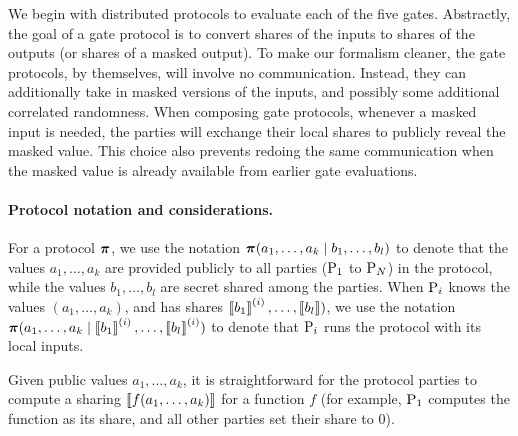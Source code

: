 
We begin with distributed protocols to evaluate each of the five gates. Abstractly, the goal of a gate protocol is to convert  shares of the inputs to shares of the outputs (or shares of a masked output). To make our formalism cleaner, the gate protocols, by themselves, will involve no communication. Instead, they can additionally take in masked versions of the inputs, and possibly some additional correlated randomness. When composing gate protocols, whenever a masked input is needed, the parties will exchange their local shares to publicly reveal the masked value. This choice also prevents redoing the same communication when the masked value is already available from earlier gate evaluations.


\iffull
\paragraph{Protocol notation and considerations.}
For a protocol $\boldsymbol{\pi}$, we use the notation $\boldsymbol{\pi}(a_1, \dots, a_k \mid b_1, \dots, b_l)$ to denote that the values $a_1, \dots, a_k$ are provided publicly to all parties ($\textnormal{P}_1$ to $\textnormal{P}_N$) in the protocol, while the values $b_1, \dots, b_l$ are secret shared among the parties. When $\textnormal{P}_i$ knows the values $(a_1, \dots, a_k)$, and has shares $\left\llbracket b_1 \right\rrbracket^{(i)}, \dots, \left\llbracket b_l \right\rrbracket)$, we use the notation $\boldsymbol{\pi}(a_1, \dots, a_k \mid \left\llbracket b_1 \right\rrbracket^{(i)}, \dots, \left\llbracket b_l \right\rrbracket^{(i)})$ to denote that $\textnormal{P}_i$ runs the protocol with its local inputs. 

Given public values $a_1, \dots, a_k$, it is straightforward for the protocol parties to compute a sharing $\left\llbracket f(a_1, \dots, a_k) \right\rrbracket$ for a function $f$ (for example, $\textnormal{P}_1$ computes the function as its share, and all other parties set their share to $0$).
\fi

